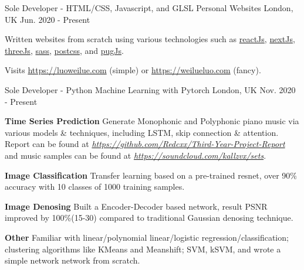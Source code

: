 

\begin{cventries}

  \cventry
    {Sole Developer - HTML/CSS, Javascript, and GLSL} %
    {Personal Websites} %
    {London, UK} %
    {Jun. 2020 - Present} %
    {
      \begin{cvitems} %
        \item {Written websites from scratch using various technologies such as \href{https://reactjs.org/}{reactJs}, \href{https://nextjs.org/}{nextJs}, \href{https://threejs.org/}{threeJs}, \href{https://sass-lang.com/}{sass},  \href{https://postcss.org/}{postcss}, and \href{https://pugjs.org/api/getting-started.html}{pugJs}.}
        \item Visits \url{https://luoweilue.com} (simple) or \url{https://weilueluo.com} (fancy).
      \end{cvitems}
    }
    
  \cventry
    {Sole Developer - Python} %
    {Machine Learning with Pytorch} %
    {London, UK} %
    {Nov. 2020 - Present} %
    {
      \begin{cvitems} %
        \item {\textbf{Time Series Prediction} Generate Monophonic and Polyphonic piano music via various models \& techniques, including LSTM, skip connection \& attention. Report can be found at \href{https://github.com/Redcxx/Third-Year-Project-Report}{\textit{https://github.com/Redcxx/Third-Year-Project-Report}} and music samples can be found at \href{https://soundcloud.com/kallzvx/sets}{\textit{https://soundcloud.com/kallzvx/sets}}.}
        \item {\textbf{Image Classification} Transfer learning based on a pre-trained resnet, over 90\% accuracy with 10 classes of 1000 training samples.}
        \item {\textbf{Image Denosing} Built a Encoder-Decoder based network, result PSNR improved  by 100\%(15-30) compared to traditional Gaussian denosing technique.}
        \item {\textbf{Other} Familiar with linear/polynomial linear/logistic regression/classification; clustering algorithms like KMeans and Meanshift; SVM, kSVM, and wrote a simple network network from scratch.}
      \end{cvitems}
    }
    

\end{cventries}
